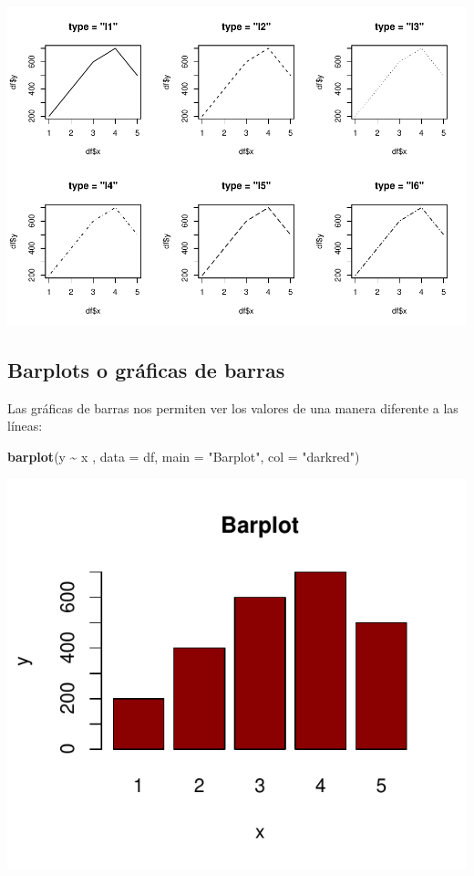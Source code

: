 \documentclass[
]{book}
\newenvironment{Shaded}{\begin{snugshade}}{\end{snugshade}}
\newcommand{\AttributeTok}[1]{\textcolor[rgb]{0.13,0.29,0.53}{#1}}
\newcommand{\FunctionTok}[1]{\textcolor[rgb]{0.13,0.29,0.53}{\textbf{#1}}}
\newcommand{\NormalTok}[1]{#1}
\newcommand{\SpecialCharTok}[1]{\textcolor[rgb]{0.81,0.36,0.00}{\textbf{#1}}}
\newcommand{\StringTok}[1]{\textcolor[rgb]{0.31,0.60,0.02}{#1}}
\begin{document}
\includegraphics{R_Manual_files/figure-latex/unnamed-chunk-198-1.pdf}

\hfill\break
\hfill\break

\subsection{Barplots o gráficas de barras}\label{barplots-o-gruxe1ficas-de-barras}

\hfill\break
Las gráficas de barras nos permiten ver los valores de una manera diferente a las líneas:\\

\begin{Shaded}
\begin{Highlighting}[]
\FunctionTok{barplot}\NormalTok{(y }\SpecialCharTok{\textasciitilde{}}\NormalTok{ x , }\AttributeTok{data =}\NormalTok{ df, }\AttributeTok{main =} \StringTok{"Barplot"}\NormalTok{, }\AttributeTok{col =} \StringTok{"darkred"}\NormalTok{)}
\end{Highlighting}
\end{Shaded}

\begin{center}\includegraphics{R_Manual_files/figure-latex/unnamed-chunk-199-1} \end{center}
\end{document}
